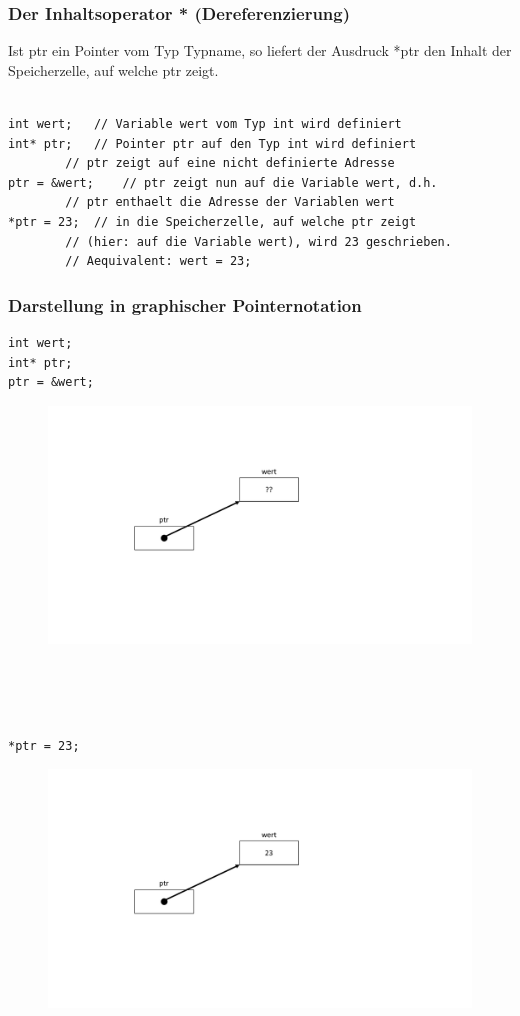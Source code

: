 \subsubsection{Der Inhaltsoperator * \textbf{(Dereferenzierung)}}
\label{sec:Der Inhaltsoperator}
Ist ptr ein Pointer vom Typ Typname, so liefert der Ausdruck *ptr den Inhalt der Speicherzelle, auf welche ptr zeigt.\\
\\
\noindent
\begin{minipage}{\linewidth}
\begin{lstlisting}
int wert;	// Variable wert vom Typ int wird definiert
int* ptr;	// Pointer ptr auf den Typ int wird definiert
		// ptr zeigt auf eine nicht definierte Adresse
ptr = &wert;	// ptr zeigt nun auf die Variable wert, d.h.
		// ptr enthaelt die Adresse der Variablen wert
*ptr = 23;	// in die Speicherzelle, auf welche ptr zeigt
		// (hier: auf die Variable wert), wird 23 geschrieben.
		// Aequivalent: wert = 23;
\end{lstlisting}
\end{minipage}

\subsubsection{Darstellung in graphischer Pointernotation}
\label{sec:Darstellung in graphischer Pointernotation}
\noindent
\begin{minipage}{\linewidth}
\begin{lstlisting}
int wert;
int* ptr;
ptr = &wert;
\end{lstlisting}
\end{minipage}
\begin{figure}[h]
	\centering
	\includegraphics[width=0.4\linewidth]{images/pointer7.pdf}
\end{figure}
\\ \\ \\
\noindent
\begin{minipage}{\linewidth}
\begin{lstlisting}
*ptr = 23;
\end{lstlisting}
\end{minipage}
\begin{figure}[h]
	\centering
	\includegraphics[width=0.4\linewidth]{images/pointer8.pdf}
\end{figure}
\\ \\ \\

